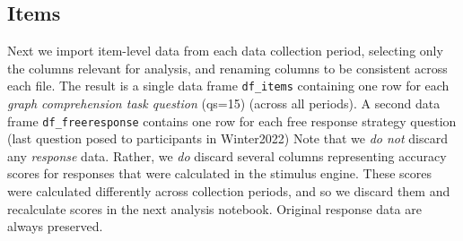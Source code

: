 \documentclass[
  letterpaper,
  DIV=11,
  numbers=noendperiod]{scrreprt}
\newenvironment{Shaded}{\begin{snugshade}}{\end{snugshade}}
\newcommand{\CommentTok}[1]{\textcolor[rgb]{0.37,0.37,0.37}{#1}}
\newcommand{\FunctionTok}[1]{\textcolor[rgb]{0.28,0.35,0.67}{#1}}
\newcommand{\NormalTok}[1]{\textcolor[rgb]{0.00,0.23,0.31}{#1}}
\newcommand{\OtherTok}[1]{\textcolor[rgb]{0.00,0.23,0.31}{#1}}
\newcommand{\SpecialCharTok}[1]{\textcolor[rgb]{0.37,0.37,0.37}{#1}}
\newcommand{\StringTok}[1]{\textcolor[rgb]{0.13,0.47,0.30}{#1}}
\begin{document}
\begin{Shaded}
\end{Shaded}

\hypertarget{items}{%
\subsection{Items}\label{items}}

Next we import item-level data from each data collection period,
selecting only the columns relevant for analysis, and renaming columns
to be consistent across each file. The result is a single data frame
\texttt{df\_items} containing one row for each \emph{graph comprehension
task question} (qs=15) (across all periods). A second data frame
\texttt{df\_freeresponse} contains one row for each free response
strategy question (last question posed to participants in Winter2022)
Note that we \emph{do not} discard any \emph{response} data. Rather, we
\emph{do} discard several columns representing accuracy scores for
responses that were calculated in the stimulus engine. These scores were
calculated differently across collection periods, and so we discard them
and recalculate scores in the next analysis notebook. Original response
data are always preserved.
\end{document}

